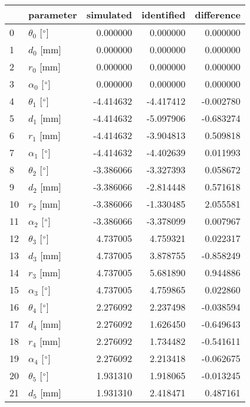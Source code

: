 \documentclass{standalone}%
\begin{document}
%
\normalsize%
\begin{tabular}{llrrr}
\toprule
{} &                 parameter & simulated & identified & difference \\
\midrule
0  &  $\theta_{0}$ [$\degree$] &  0.000000 &   0.000000 &   0.000000 \\
1  &              $d_{0}$ [mm] &  0.000000 &   0.000000 &   0.000000 \\
2  &              $r_{0}$ [mm] &  0.000000 &   0.000000 &   0.000000 \\
3  &  $\alpha_{0}$ [$\degree$] &  0.000000 &   0.000000 &   0.000000 \\
4  &  $\theta_{1}$ [$\degree$] & -4.414632 &  -4.417412 &  -0.002780 \\
5  &              $d_{1}$ [mm] & -4.414632 &  -5.097906 &  -0.683274 \\
6  &              $r_{1}$ [mm] & -4.414632 &  -3.904813 &   0.509818 \\
7  &  $\alpha_{1}$ [$\degree$] & -4.414632 &  -4.402639 &   0.011993 \\
8  &  $\theta_{2}$ [$\degree$] & -3.386066 &  -3.327393 &   0.058672 \\
9  &              $d_{2}$ [mm] & -3.386066 &  -2.814448 &   0.571618 \\
10 &              $r_{2}$ [mm] & -3.386066 &  -1.330485 &   2.055581 \\
11 &  $\alpha_{2}$ [$\degree$] & -3.386066 &  -3.378099 &   0.007967 \\
12 &  $\theta_{3}$ [$\degree$] &  4.737005 &   4.759321 &   0.022317 \\
13 &              $d_{3}$ [mm] &  4.737005 &   3.878755 &  -0.858249 \\
14 &              $r_{3}$ [mm] &  4.737005 &   5.681890 &   0.944886 \\
15 &  $\alpha_{3}$ [$\degree$] &  4.737005 &   4.759865 &   0.022860 \\
16 &  $\theta_{4}$ [$\degree$] &  2.276092 &   2.237498 &  -0.038594 \\
17 &              $d_{4}$ [mm] &  2.276092 &   1.626450 &  -0.649643 \\
18 &              $r_{4}$ [mm] &  2.276092 &   1.734482 &  -0.541611 \\
19 &  $\alpha_{4}$ [$\degree$] &  2.276092 &   2.213418 &  -0.062675 \\
20 &  $\theta_{5}$ [$\degree$] &  1.931310 &   1.918065 &  -0.013245 \\
21 &              $d_{5}$ [mm] &  1.931310 &   2.418471 &   0.487161 \\

\end{tabular}
\end{document}
